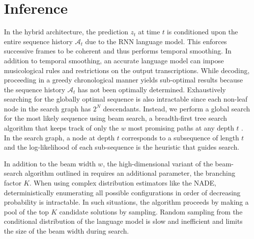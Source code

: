 \documentclass{article}
\begin{document}
\section{Inference}

In the hybrid architecture, the prediction $z_t$ at time $t$ is conditioned upon the entire sequence history $\mathcal A_t$ due to the RNN language model. This enforces successive frames to be coherent and thus performs temporal smoothing. In addition to temporal smoothing, an accurate language model can impose musicological rules and restrictions on the output transcriptions. While decoding, proceeding in a greedy chronological manner yields sub-optimal results because the sequence history $\mathcal A_t$ has not been optimally determined. Exhaustively searching for the globally optimal sequence is also intractable since each non-leaf node in the search graph has $2^{N}$ descendants. Instead, we perform a global search for the most likely sequence using beam search, a breadth-first tree search algorithm that keeps track of only the $w$ most promising paths at any depth $t$ \cite{graves2012sequence,boulanger2013high,boulangerphone}. In the search graph, a node at depth $t$ corresponds to a subsequence of 
length $t$ and the log-likelihood of each sub-sequence is the heuristic that guides search. 

In addition to the beam width $w$, the high-dimensional variant of the beam-search algorithm outlined in \cite{boulanger2013high} requires an additional parameter, the branching factor $K$. When using complex distribution estimators like the NADE, deterministically enumerating all possible configurations in order of decreasing probability is intractable. In such situations, the algorithm proceeds by making a pool of the top $K$ candidate solutions by sampling. Random sampling from the conditional distribution of the language model is slow and inefficient and limits the size of the beam width during search. 

\end{document}
